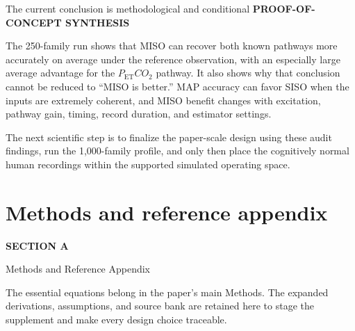 \documentclass[aspectratio=169,11pt]{beamer}
\newcommand{\PETCOtwo}{P_{\mathrm{ET}}CO_2}
\newcommand{\sectionlabel}[1]{%
  {\color{Accent}\fontsize{8}{9.5}\selectfont\bfseries\MakeUppercase{#1}}\par\vspace{0.12cm}}
\newcommand{\sectionframe}[3]{%
  \begin{frame}[plain]
    \vspace{0.7cm}
    {\color{Accent}\fontsize{10}{12}\selectfont\bfseries SECTION #1}\par\vspace{0.45cm}
    {\color{Ink}\fontsize{24.5}{28}\selectfont #2}\par\vspace{0.55cm}
    {\color{Body}\fontsize{14.5}{19}\selectfont #3}
  \end{frame}}
\begin{document}
\begin{frame}{The current conclusion is methodological and conditional}
\sectionlabel{Proof-of-Concept Synthesis}
The 250-family run shows that MISO can recover both known pathways more accurately
on average under the reference observation, with an especially large average
advantage for the $\PETCOtwo$ pathway. It also shows why that conclusion cannot
be reduced to ``MISO is better.'' MAP accuracy can favor SISO when the inputs are
extremely coherent, and MISO benefit changes with excitation, pathway gain,
timing, record duration, and estimator settings.

\vspace{0.45cm}
The next scientific step is to finalize the paper-scale design using these audit
findings, run the 1,000-family profile, and only then place the cognitively normal
human recordings within the supported simulated operating space.
\end{frame}


\section{Methods and reference appendix}
\sectionframe{A}{Methods and Reference Appendix}{%
The essential equations belong in the paper's main Methods. The expanded
derivations, assumptions, and source bank are retained here to stage the
supplement and make every design choice traceable.}
\end{document}
